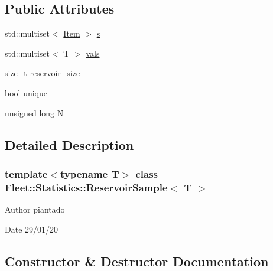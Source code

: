 \subsection*{Public Attributes}
\begin{DoxyCompactItemize}
\item 
std\+::multiset$<$ \hyperlink{class_fleet_1_1_statistics_1_1_reservoir_sample_1_1_item}{Item} $>$ \hyperlink{class_fleet_1_1_statistics_1_1_reservoir_sample_a7cf0266d882988e2a61b857d123c8b58}{s}
\item 
std\+::multiset$<$ T $>$ \hyperlink{class_fleet_1_1_statistics_1_1_reservoir_sample_a9ffdb177a62651a2280099553124c433}{vals}
\item 
size\+\_\+t \hyperlink{class_fleet_1_1_statistics_1_1_reservoir_sample_a94ccb7246b63257eeee446ab4574387a}{reservoir\+\_\+size}
\item 
bool \hyperlink{class_fleet_1_1_statistics_1_1_reservoir_sample_ae3376d7008fd736ff141fa811aad4b65}{unique}
\item 
unsigned long \hyperlink{class_fleet_1_1_statistics_1_1_reservoir_sample_a1e0c5104f173107e23900ff707df05ab}{N}
\end{DoxyCompactItemize}


\subsection{Detailed Description}
\subsubsection*{template$<$typename T$>$\newline
class Fleet\+::\+Statistics\+::\+Reservoir\+Sample$<$ T $>$}

\begin{DoxyAuthor}{Author}
piantado 
\end{DoxyAuthor}
\begin{DoxyDate}{Date}
29/01/20 
\end{DoxyDate}


\subsection{Constructor \& Destructor Documentation}
\mbox{\label{class_fleet_1_1_statistics_1_1_reservoir_sample_a0dde0cb8cfbb14a0bbf8db7f4bb316e9}} 
